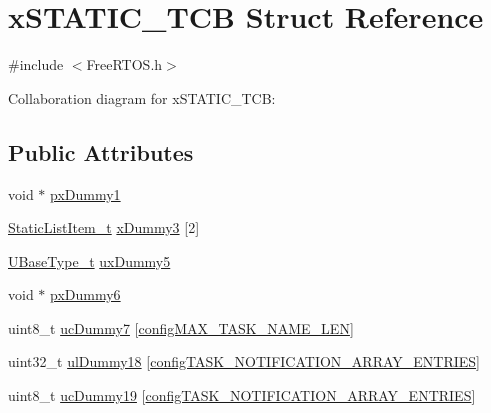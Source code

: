 \hypertarget{structx_s_t_a_t_i_c___t_c_b}{}\section{x\+S\+T\+A\+T\+I\+C\+\_\+\+T\+CB Struct Reference}
\label{structx_s_t_a_t_i_c___t_c_b}


{\ttfamily \#include $<$Free\+R\+T\+O\+S.\+h$>$}



Collaboration diagram for x\+S\+T\+A\+T\+I\+C\+\_\+\+T\+CB\+:
\subsection*{Public Attributes}
\begin{DoxyCompactItemize}
\item 
void $\ast$ \hyperlink{structx_s_t_a_t_i_c___t_c_b_a2f66b620fdeb13f8969f27e1bbb4d1d1}{px\+Dummy1}
\item 
\hyperlink{externals_2freertos_2include_2_free_r_t_o_s_8h_a1d31bc0472385a87424518da484d9e09}{Static\+List\+Item\+\_\+t} \hyperlink{structx_s_t_a_t_i_c___t_c_b_a7f182aa8f5003494f63d975dabcb3ec1}{x\+Dummy3} \mbox{[}2\mbox{]}
\item 
\hyperlink{externals_2freertos_2portable_2_g_c_c_2_a_r_m___c_m0_2portmacro_8h_a646f89d4298e4f5afd522202b11cb2e6}{U\+Base\+Type\+\_\+t} \hyperlink{structx_s_t_a_t_i_c___t_c_b_ab950bb498901ef7291e49086e5a2efd0}{ux\+Dummy5}
\item 
void $\ast$ \hyperlink{structx_s_t_a_t_i_c___t_c_b_a416495e152e5caef64994f72329c60b0}{px\+Dummy6}
\item 
uint8\+\_\+t \hyperlink{structx_s_t_a_t_i_c___t_c_b_a308771ccd6723cad777695d84a0a2a30}{uc\+Dummy7} \mbox{[}\hyperlink{vendor_2ceedling_2plugins_2freertos_2vendor_2freertos_2include_2_free_r_t_o_s_8h_ac388dc4041aab6997348828eb27fc1a8}{config\+M\+A\+X\+\_\+\+T\+A\+S\+K\+\_\+\+N\+A\+M\+E\+\_\+\+L\+EN}\mbox{]}
\item 
uint32\+\_\+t \hyperlink{structx_s_t_a_t_i_c___t_c_b_a09231b4c92acd645dc72d7de8adfee3d}{ul\+Dummy18} \mbox{[}\hyperlink{externals_2freertos_2include_2_free_r_t_o_s_8h_a5413143d3773c8e31f305805f4cad871}{config\+T\+A\+S\+K\+\_\+\+N\+O\+T\+I\+F\+I\+C\+A\+T\+I\+O\+N\+\_\+\+A\+R\+R\+A\+Y\+\_\+\+E\+N\+T\+R\+I\+ES}\mbox{]}
\item 
uint8\+\_\+t \hyperlink{structx_s_t_a_t_i_c___t_c_b_a8d894d750aed39e2639637b9d6582b48}{uc\+Dummy19} \mbox{[}\hyperlink{externals_2freertos_2include_2_free_r_t_o_s_8h_a5413143d3773c8e31f305805f4cad871}{config\+T\+A\+S\+K\+\_\+\+N\+O\+T\+I\+F\+I\+C\+A\+T\+I\+O\+N\+\_\+\+A\+R\+R\+A\+Y\+\_\+\+E\+N\+T\+R\+I\+ES}\mbox{]}
\end{DoxyCompactItemize}


